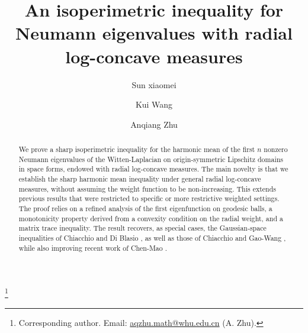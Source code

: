 \documentclass[11pt,leqno]{amsart}
\numberwithin{equation}{section}
\begin{document}
\title[Neumann eigenvalues of the Witten-Laplacian]{An isoperimetric inequality for  Neumann eigenvalues with radial log-concave measures}

\author{Sun xiaomei } 
\address{College of informatics, Huazhong Agricultural University, 430070, Wuhan, China}

\author{Kui Wang} 
\address{School of Mathematical Sciences, Soochow University, Suzhou, 215006, China}

\author{Anqiang Zhu}
\address{School of Mathematics and Statistics, Wuhan University, Wuhan 430072, China}
\thanks{Corresponding author. Email: \href{mailto:aqzhu.math@whu.edu.cn}{aqzhu.math@whu.edu.cn} (A. Zhu).}

\begin{abstract}
 We prove a sharp isoperimetric inequality for the harmonic mean of the first $n$ nonzero Neumann eigenvalues of the Witten-Laplacian on origin-symmetric Lipschitz domains in space forms, endowed with radial log-concave measures. The main novelty is that we establish the sharp harmonic mean inequality under general radial log-concave measures, without assuming the weight function  to be non-increasing. This extends previous results that were restricted to specific or more restrictive weighted settings. The proof relies on a refined analysis of the first eigenfunction on geodesic balls, a monotonicity property derived from a convexity condition on the radial weight, and a matrix trace inequality. The result recovers, as special cases, the Gaussian‑space inequalities of Chiacchio and Di Blasio \cite{CB12}, as well as those of Chiacchio \cite{Fr26} and Gao-Wang \cite{GW26}, while also improving recent work of Chen-Mao \cite{CM24}.


\end{abstract}



\maketitle
\end{document}
